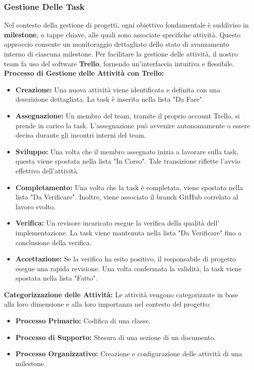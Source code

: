 \documentclass{article}
\begin{document}
\subsubsection{Gestione Delle Task}

Nel contesto della gestione di progetti, ogni obiettivo fondamentale è suddiviso in \textbf{milestone}, o tappe chiave, alle quali sono associate specifiche attività. Questo approccio consente un monitoraggio dettagliato dello stato di avanzamento interno di ciascuna milestone. Per facilitare la gestione delle attività, il nostro team fa uso del software \textbf{Trello}, fornendo un'interfaccia intuitiva e flessibile.\\
\textbf{Processo di Gestione delle Attività con Trello:}
\begin{itemize}
    \item \textbf{Creazione:}
    Una nuova attività viene identificata e definita con una descrizione dettagliata.
    La task è inserita nella lista "Da Fare".
    \item \textbf{Assegnazione:}
    Un membro del team, tramite il proprio account Trello, si prende in carico la task.
    L'assegnazione può avvenire autonomamente o essere decisa durante gli incontri interni del team.
    \item \textbf{Sviluppo:}
    Una volta che il membro assegnato inizia a lavorare sulla task, questa viene spostata nella lista "In Corso".
    Tale transizione riflette l'avvio effettivo dell'attività.
    \item \textbf{Completamento:}
    Una volta che la task è completata, viene spostata nella lista "Da Verificare".
    Inoltre, viene associato il branch GitHub correlato al lavoro svolto.
    \item \textbf{Verifica:}
    Un revisore incaricato esegue la verifica della qualità dell' implementazione.
    La task viene mantenuta nella lista "Da Verificare" fino a conclusione della verifica.
    \item \textbf{Accettazione:}
    Se la verifica ha esito positivo, il responsabile di progetto esegue una rapida revisione.
    Una volta confermata la validità, la task viene spostata nella lista "Fatto".
\end{itemize}

\textbf{Categorizzazione delle Attività:} Le attività vengono categorizzate in base alla loro dimensione e alla loro importanza nel contesto del progetto:
\begin{itemize}
    \item \textbf{Processo Primario:} Codifica di una classe.
    \item \textbf{Processo di Supporto:} Stesura di una sezione di un documento.
    \item \textbf{Processo Organizzativo:} Creazione e configurazione delle attività di una milestone.
\end{itemize}
\end{document}
